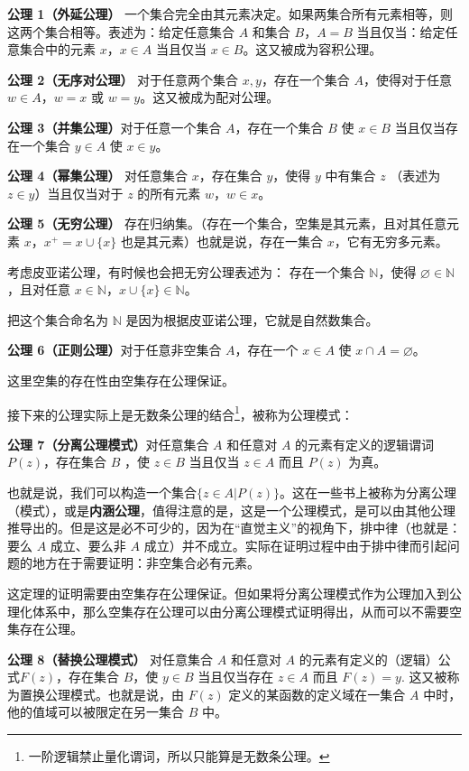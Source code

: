 \textbf{公理 1（外延公理）} 一个集合完全由其元素决定。如果两集合所有元素相等，则这两个集合相等。表述为：给定任意集合 $A$ 和集合 $B$，$A=B$ 当且仅当：给定任意集合中的元素 $x$，$x \in A$ 当且仅当 $x \in B$。这又被成为容积公理。

\textbf{公理 2（无序对公理）} 对于任意两个集合 $x,y$，存在一个集合 $A$，使得对于任意 $w\in A$，$w=x$ 或 $w=y$。这又被成为配对公理。

\textbf{公理 3（并集公理）}对于任意一个集合 $A$，存在一个集合 $B$ 使 $x\in B$ 当且仅当存在一个集合 $y\in A$ 使 $x\in y$。

\textbf{公理 4（幂集公理）} 对任意集合 $x$，存在集合 $y$，使得 $y$ 中有集合 $z$ （表述为 $z \in y$）当且仅当对于 $z$ 的所有元素 $w$，$w\in x$。

\textbf{公理 5（无穷公理）} 存在归纳集。（存在一个集合，空集是其元素，且对其任意元素 $x$，$x^+ = x\cup \{x\}$ 也是其元素）也就是说，存在一集合 $x$，它有无穷多元素。

考虑皮亚诺公理，有时候也会把无穷公理表述为：
存在一个集合 $\mathbb{N}$，使得 $\varnothing\in\mathbb{N}$，且对任意 $x\in \mathbb{N}$，$x\cup\{x\}\in\mathbb{N}$。

把这个集合命名为 $\mathbb{N}$ 是因为根据皮亚诺公理，它就是自然数集合。

\textbf{公理 6（正则公理）}对于任意非空集合 $A$，存在一个 $x\in A$ 使 $x\cap A=\varnothing$。

这里空集的存在性由空集存在公理保证。

接下来的公理实际上是无数条公理的结合\footnote{一阶逻辑禁止量化谓词，所以只能算是无数条公理。}，被称为公理模式：

\textbf{公理 7（分离公理模式）}对任意集合 $A$ 和任意对 $A$ 的元素有定义的逻辑谓词 $P(z)$，存在集合 $B$ ，使 $z\in B$ 当且仅当 $z\in A$ 而且 $P(z)$ 为真。

也就是说，我们可以构造一个集合$\{z\in A | P(z)\}$。这在一些书上被称为分离公理（模式），或是\textbf{内涵公理}，值得注意的是，这是一个公理模式，是可以由其他公理推导出的。但是这是必不可少的，因为在“直觉主义”的视角下，排中律（也就是：要么 $A$ 成立、要么非 $A$ 成立）并不成立。实际在证明过程中由于排中律而引起问题的地方在于需要证明：非空集合必有元素。

这定理的证明需要由空集存在公理保证。但如果将分离公理模式作为公理加入到公理化体系中，那么空集存在公理可以由分离公理模式证明得出，从而可以不需要空集存在公理。

\textbf{公理 8（替换公理模式）} 对任意集合 $A$ 和任意对 $A$ 的元素有定义的（逻辑）公式$F(z)$，存在集合 $B$，使 $y\in B$ 当且仅当存在 $z\in A$ 而且 $F(z)=y$. 这又被称为置换公理模式。也就是说，由 $F(z)$ 定义的某函数的定义域在一集合 $A$ 中时，他的值域可以被限定在另一集合 $B$ 中。

